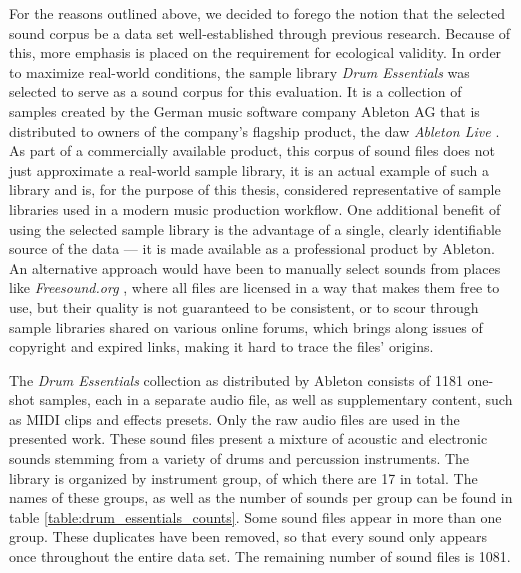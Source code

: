 \smallskip

For the reasons outlined above, we decided to forego the notion that
the selected sound corpus be a data set well-established through previous
research. Because of this, more emphasis is placed on the requirement for
ecological validity. In order to maximize real-world conditions, the sample
library \textit{Drum Essentials} \citep{drumessentials2019} was selected to
serve as a sound corpus for this evaluation. It is a collection of samples
created by the German music software company Ableton AG that is distributed to
owners of the company's flagship product, the \gls{daw} \textit{Ableton Live}
\citep{abletonlive2019}. As part of a commercially available product, this
corpus of sound files does not just approximate a real-world sample library, it
is an actual example of such a library and is, for the purpose of this thesis,
considered representative of sample libraries used in a modern music production
workflow. One additional benefit of using the selected sample library is the
advantage of a single, clearly identifiable source of the data --- it is made
available as a professional product by Ableton. An alternative approach would
have been to manually select sounds from places like \textit{Freesound.org}
\citep{font2013}, where all files are licensed in a way that makes them free to
use, but their quality is not guaranteed to be consistent, or to scour through
sample libraries shared on various online forums, which brings along issues of
copyright and expired links, making it hard to trace the files' origins.

\smallskip

The \textit{Drum Essentials} collection as distributed by Ableton consists of
1181 one-shot samples, each in a separate audio file, as well as supplementary
content, such as MIDI clips and effects presets. Only the raw audio files are
used in the presented work. These sound files present a mixture of acoustic
and electronic sounds stemming from a variety of drums and percussion
instruments. The library is organized by instrument group, of which there are
17 in total. The names of these groups, as well as the number of sounds per
group can be found in table \ref{table:drum_essentials_counts}. Some sound files
appear in more than one group. These duplicates have been removed, so that every
sound only appears once throughout the entire data set. The remaining number of
sound files is 1081.

\renewcommand{\arraystretch}{1.2}

